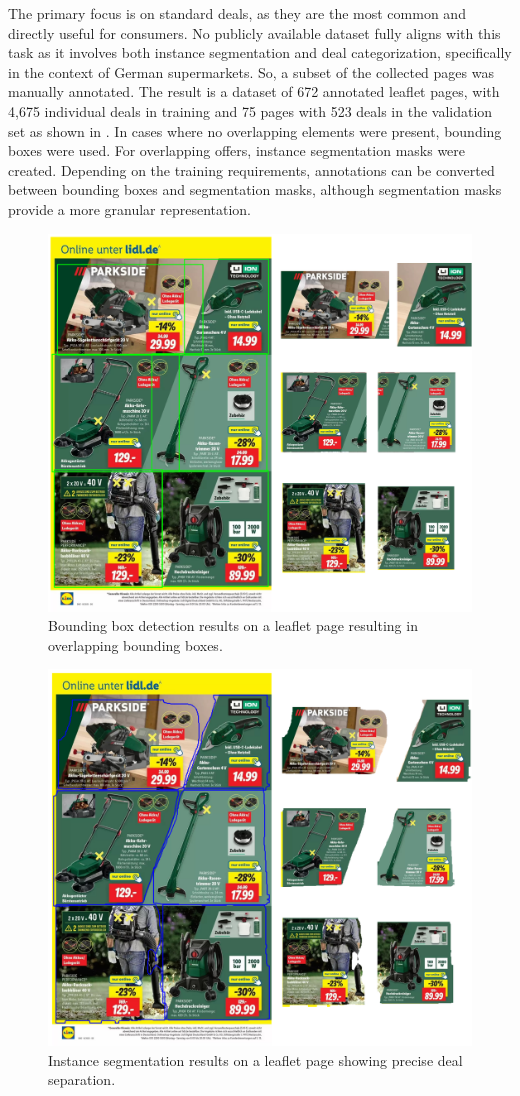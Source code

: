 \documentclass[11pt]{article}
\begin{document}
The primary focus is on standard deals, as they are the most common and directly useful for consumers. No publicly available dataset fully aligns with this task as it involves both instance segmentation and deal categorization, specifically in the context of German supermarkets. So, a subset of the collected pages was manually annotated. The result is a dataset of 672 annotated leaflet pages, with 4,675 individual deals in training and 75 pages with 523 deals in the validation set as shown in . In cases where no overlapping elements were present, bounding boxes were used. For overlapping offers, instance segmentation masks were created. Depending on the training requirements, annotations can be converted between bounding boxes and segmentation masks, although segmentation masks provide a more granular representation.

\begin{figure}[h!]
    \centering
    \includegraphics[width=0.6\linewidth]{figures/deal_detection/bbox_page.png}
    \caption{Bounding box detection results on a leaflet page resulting in overlapping bounding boxes.}
    \label{fig:ddetect_bbox_page}
\end{figure}

\begin{figure}[h!]
    \centering
    \includegraphics[width=0.6\linewidth]{figures/deal_detection/mask_page.png}
    \caption{Instance segmentation results on a leaflet page showing precise deal separation.}
    \label{fig:ddetect_mask_page}
\end{figure}
\end{document}
